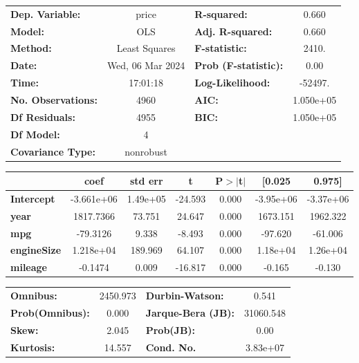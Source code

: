 \documentclass[
  letterpaper,
  DIV=11,
  numbers=noendperiod]{scrreprt}
\begin{document}
\begin{center}
\begin{tabular}{lclc}
\toprule
\textbf{Dep. Variable:}    &      price       & \textbf{  R-squared:         } &     0.660   \\
\textbf{Model:}            &       OLS        & \textbf{  Adj. R-squared:    } &     0.660   \\
\textbf{Method:}           &  Least Squares   & \textbf{  F-statistic:       } &     2410.   \\
\textbf{Date:}             & Wed, 06 Mar 2024 & \textbf{  Prob (F-statistic):} &     0.00    \\
\textbf{Time:}             &     17:01:18     & \textbf{  Log-Likelihood:    } &   -52497.   \\
\textbf{No. Observations:} &        4960      & \textbf{  AIC:               } & 1.050e+05   \\
\textbf{Df Residuals:}     &        4955      & \textbf{  BIC:               } & 1.050e+05   \\
\textbf{Df Model:}         &           4      & \textbf{                     } &             \\
\textbf{Covariance Type:}  &    nonrobust     & \textbf{                     } &             \\
\bottomrule
\end{tabular}
\begin{tabular}{lcccccc}
                    & \textbf{coef} & \textbf{std err} & \textbf{t} & \textbf{P$> |$t$|$} & \textbf{[0.025} & \textbf{0.975]}  \\
\midrule
\textbf{Intercept}  &   -3.661e+06  &     1.49e+05     &   -24.593  &         0.000        &    -3.95e+06    &    -3.37e+06     \\
\textbf{year}       &    1817.7366  &       73.751     &    24.647  &         0.000        &     1673.151    &     1962.322     \\
\textbf{mpg}        &     -79.3126  &        9.338     &    -8.493  &         0.000        &      -97.620    &      -61.006     \\
\textbf{engineSize} &    1.218e+04  &      189.969     &    64.107  &         0.000        &     1.18e+04    &     1.26e+04     \\
\textbf{mileage}    &      -0.1474  &        0.009     &   -16.817  &         0.000        &       -0.165    &       -0.130     \\
\bottomrule
\end{tabular}
\begin{tabular}{lclc}
\textbf{Omnibus:}       & 2450.973 & \textbf{  Durbin-Watson:     } &     0.541  \\
\textbf{Prob(Omnibus):} &   0.000  & \textbf{  Jarque-Bera (JB):  } & 31060.548  \\
\textbf{Skew:}          &   2.045  & \textbf{  Prob(JB):          } &      0.00  \\
\textbf{Kurtosis:}      &  14.557  & \textbf{  Cond. No.          } &  3.83e+07  \\
\bottomrule
\end{tabular}
\end{center}
\end{document}

